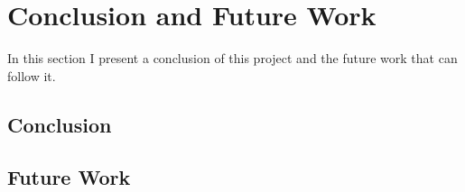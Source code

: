 \section{Conclusion and Future Work}
In this section I present a conclusion of this project and the future work that can follow it.

\subsection{Conclusion}



\subsection{Future Work}


